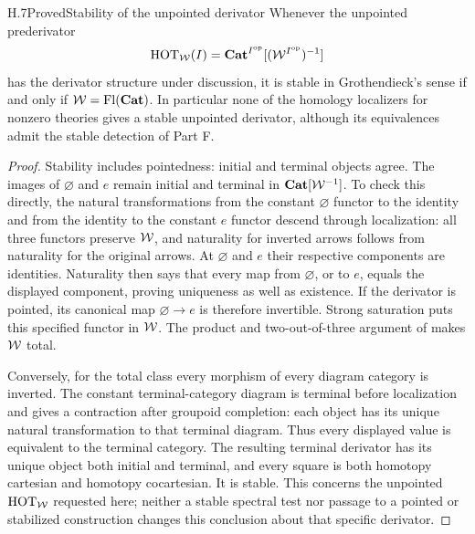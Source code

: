 \begin{claim}{H.7}{Proved}{Stability of the unpointed derivator}
Whenever the unpointed prederivator
\[
 \mathrm{HOT}_{\mathcal{W}}(I)=\mathbf{Cat}^{I^{\mathrm{op}}}[(\mathcal{W}^{I^{\mathrm{op}}})^{-1}]
\]
has the derivator structure under discussion, it is stable in Grothendieck's sense if and only if $\mathcal{W}=\operatorname{Fl}(\mathbf{Cat})$. In particular none of the homology localizers for nonzero theories gives a stable unpointed derivator, although its equivalences admit the stable detection of Part F.
\end{claim}
\begin{proof}
Stability includes pointedness: initial and terminal objects agree. The images of $\varnothing$ and $e$ remain initial and terminal in $\mathbf{Cat}[\mathcal{W}^{-1}]$. To check this directly, the natural transformations from the constant $\varnothing$ functor to the identity and from the identity to the constant $e$ functor descend through localization: all three functors preserve $\mathcal{W}$, and naturality for inverted arrows follows from naturality for the original arrows. At $\varnothing$ and $e$ their respective components are identities. Naturality then says that every map from $\varnothing$, or to $e$, equals the displayed component, proving uniqueness as well as existence. If the derivator is pointed, its canonical map $\varnothing\to e$ is therefore invertible. Strong saturation  puts this specified functor in $\mathcal{W}$. The product and two-out-of-three argument of  makes $\mathcal{W}$ total.

Conversely, for the total class every morphism of every diagram category is inverted. The constant terminal-category diagram is terminal before localization and gives a contraction after groupoid completion: each object has its unique natural transformation to that terminal diagram. Thus every displayed value is equivalent to the terminal category. The resulting terminal derivator has its unique object both initial and terminal, and every square is both homotopy cartesian and homotopy cocartesian. It is stable. This concerns the unpointed $\mathrm{HOT}_{\mathcal{W}}$ requested here; neither a stable spectral test nor passage to a pointed or stabilized construction changes this conclusion about that specific derivator.
\end{proof}

